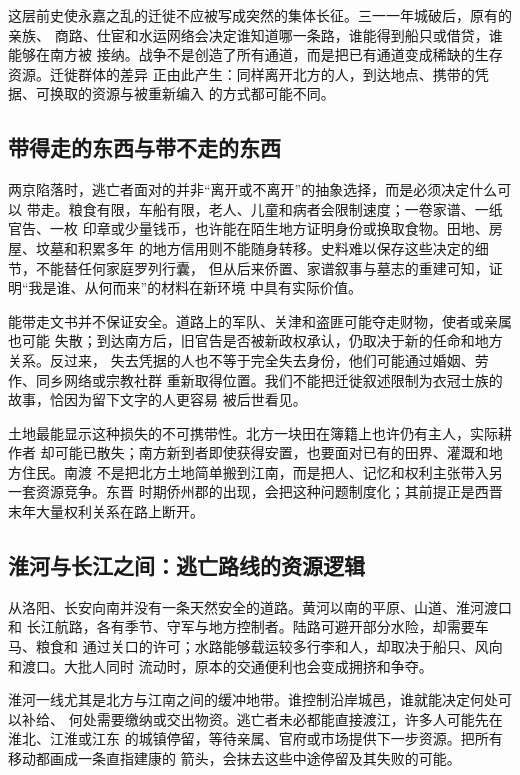 这层前史使永嘉之乱的迁徙不应被写成突然的集体长征。三一一年城破后，原有的亲族、
商路、仕宦和水运网络会决定谁知道哪一条路，谁能得到船只或借贷，谁能够在南方被
接纳。战争不是创造了所有通道，而是把已有通道变成稀缺的生存资源。迁徙群体的差异
正由此产生：同样离开北方的人，到达地点、携带的凭据、可换取的资源与被重新编入
的方式都可能不同。

\subsection{带得走的东西与带不走的东西}

两京陷落时，逃亡者面对的并非“离开或不离开”的抽象选择，而是必须决定什么可以
带走。粮食有限，车船有限，老人、儿童和病者会限制速度；一卷家谱、一纸官告、一枚
印章或少量钱币，也许能在陌生地方证明身份或换取食物。田地、房屋、坟墓和积累多年
的地方信用则不能随身转移。史料难以保存这些决定的细节，不能替任何家庭罗列行囊，
但从后来侨置、家谱叙事与墓志的重建可知，证明“我是谁、从何而来”的材料在新环境
中具有实际价值。

能带走文书并不保证安全。道路上的军队、关津和盗匪可能夺走财物，使者或亲属也可能
失散；到达南方后，旧官告是否被新政权承认，仍取决于新的任命和地方关系。反过来，
失去凭据的人也不等于完全失去身份，他们可能通过婚姻、劳作、同乡网络或宗教社群
重新取得位置。我们不能把迁徙叙述限制为衣冠士族的故事，恰因为留下文字的人更容易
被后世看见。

土地最能显示这种损失的不可携带性。北方一块田在簿籍上也许仍有主人，实际耕作者
却可能已散失；南方新到者即使获得安置，也要面对已有的田界、灌溉和地方住民。南渡
不是把北方土地简单搬到江南，而是把人、记忆和权利主张带入另一套资源竞争。东晋
时期侨州郡的出现，会把这种问题制度化；其前提正是西晋末年大量权利关系在路上断开。

\subsection{淮河与长江之间：逃亡路线的资源逻辑}

从洛阳、长安向南并没有一条天然安全的道路。黄河以南的平原、山道、淮河渡口和
长江航路，各有季节、守军与地方控制者。陆路可避开部分水险，却需要车马、粮食和
通过关口的许可；水路能够载运较多行李和人，却取决于船只、风向和渡口。大批人同时
流动时，原本的交通便利也会变成拥挤和争夺。

淮河一线尤其是北方与江南之间的缓冲地带。谁控制沿岸城邑，谁就能决定何处可以补给、
何处需要缴纳或交出物资。逃亡者未必都能直接渡江，许多人可能先在淮北、江淮或江东
的城镇停留，等待亲属、官府或市场提供下一步资源。把所有移动都画成一条直指建康的
箭头，会抹去这些中途停留及其失败的可能。

